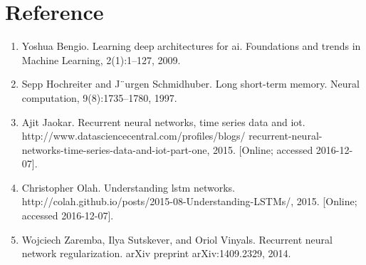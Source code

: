 \documentclass[12pt]{article}
\begin{document}
\newpage
\section{Reference}
\begin{enumerate}
\item Yoshua Bengio. Learning deep architectures for ai. Foundations and trends in Machine Learning, 2(1):1–127, 2009.

\item Sepp Hochreiter and J¨urgen Schmidhuber. Long short-term memory. Neural computation, 9(8):1735–1780, 1997.

\item Ajit Jaokar. Recurrent neural networks, time series data and iot. http://www.datasciencecentral.com/profiles/blogs/ recurrent-neural-networks-time-series-data-and-iot-part-one, 2015. [Online; accessed 2016-12-07].

\item Christopher Olah. Understanding lstm networks. http://colah.github.io/posts/2015-08-Understanding-LSTMs/, 2015. [Online; accessed 2016-12-07].

\item Wojciech Zaremba, Ilya Sutskever, and Oriol Vinyals. Recurrent neural network regularization. arXiv preprint arXiv:1409.2329, 2014.

\end{enumerate}
\end{document}
